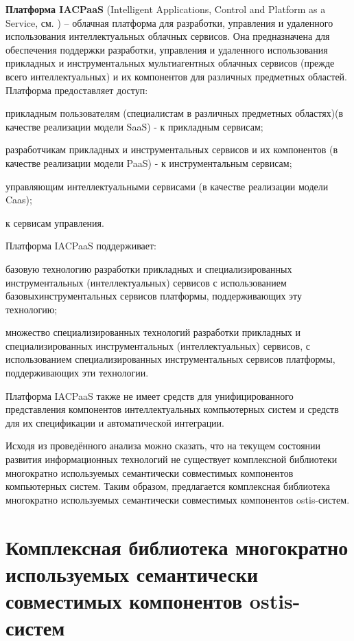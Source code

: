 \textbf{Платформа IACPaaS} (Intelligent Applications, Control and Platform as a Service, см. ) – облачная платформа для разработки, управления и удаленного использования интеллектуальных облачных сервисов. Она предназначена для обеспечения поддержки разработки, управления и удаленного использования прикладных и инструментальных мультиагентных облачных сервисов (прежде всего интеллектуальных) и их компонентов для различных предметных областей. Платформа предоставляет доступ:
\begin{textitemize}
	\item прикладным пользователям (специалистам в различных предметных областях)(в качестве реализации модели SaaS) - к прикладным сервисам;
	\item разработчикам прикладных и инструментальных сервисов и их компонентов (в качестве реализации модели PaaS) - к инструментальным сервисам;
	\item управляющим интеллектуальными сервисами (в качестве реализации модели Caas);
	\item к сервисам управления.
\end{textitemize}

Платформа IACPaaS поддерживает:

\begin{textitemize}
	\item базовую технологию разработки прикладных и специализированных инструментальных (интеллектуальных) сервисов с использованием базовыхинструментальных сервисов платформы, поддерживающих эту технологию;
	\item множество специализированных технологий разработки прикладных и специализированных инструментальных (интеллектуальных) сервисов, с использованием специализированных инструментальных сервисов платформы, поддерживающих эти технологии.
\end{textitemize}

Платформа IACPaaS также не имеет средств для унифицированного представления компонентов интеллектуальных компьютерных систем и средств для их спецификации и автоматической интеграции.

Исходя из проведённого анализа можно сказать, что на текущем состоянии развития информационных технологий не существует комплексной библиотеки многократно используемых семантически совместимых компонентов компьютерных систем. Таким образом, предлагается комплексная библиотека многократно используемых семантически совместимых компонентов ostis-систем.

\section{Комплексная библиотека многократно используемых семантически совместимых компонентов ostis-систем}
\label{ostis_library_section}

